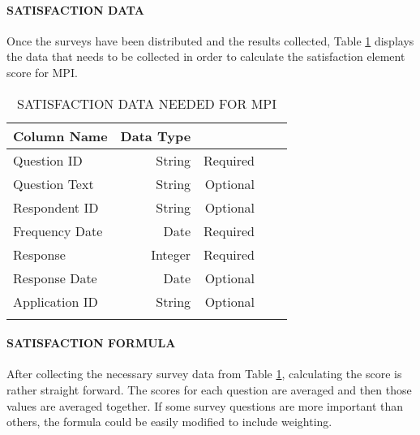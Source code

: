 \documentclass[SDSUThesis.tex]{subfiles}
\begin{document}
            \paragraph{SATISFACTION DATA}
                Once the surveys have been distributed and the results collected, Table
                \ref{tab:satisfactiondata} displays the data that needs to be collected 
                in order to calculate the satisfaction element score for MPI.
                \begin{longtable}{@{}l rr rr}
                    \toprule%
                     \centering%
                     {\bfseries Column Name}
                     & {\bfseries Data Type}
                     &  \\
                    
                    \cmidrule[0.4pt](r{0.125em}){1-1}%
                    \cmidrule[0.4pt](lr{0.125em}){2-2}%
                    \cmidrule[0.4pt](l{0.125em}){3-3}%
                    \endhead
                    
                    Question ID & String  & Required \\
                    \myrowcolour%
                    Question Text & String  & Optional \\
                    Respondent ID & String & Optional \\
                    \myrowcolour%
                    Frequency Date & Date & Required \\
                    Response & Integer & Required \\
                    \myrowcolour%
                    Response Date & Date & Optional \\
                    Application ID & String & Optional \\
                    
                    \bottomrule
                    
                    \caption{SATISFACTION DATA NEEDED FOR MPI}
                    \label{tab:satisfactiondata}
                \end{longtable}
            
            \paragraph{SATISFACTION FORMULA}
                After collecting the necessary survey data from Table \ref{tab:satisfactiondata},
                calculating the score is rather straight forward.
                The scores for each question are averaged and then those
                values are averaged together.  If some survey questions
                are more important than others, the formula could be
                easily modified to include weighting.  
            
\end{document}

